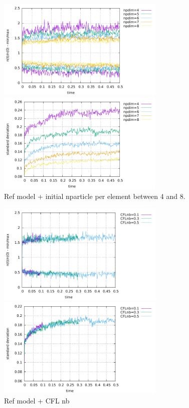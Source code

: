 \begin{center}
\includegraphics[width=8cm]{python_codes/fieldstone_30/results_streamline/markercount_npd}
\includegraphics[width=8cm]{python_codes/fieldstone_30/results_streamline/stdev_npd}\\
{\captionfont Ref model + initial nparticle per element between 4 and 8.}
\end{center}

\begin{center}
\includegraphics[width=8cm]{python_codes/fieldstone_30/results_streamline/markercount_cflnb}
\includegraphics[width=8cm]{python_codes/fieldstone_30/results_streamline/stdev_cflnb}\\
{\captionfont Ref model + CFL nb}
\end{center}


